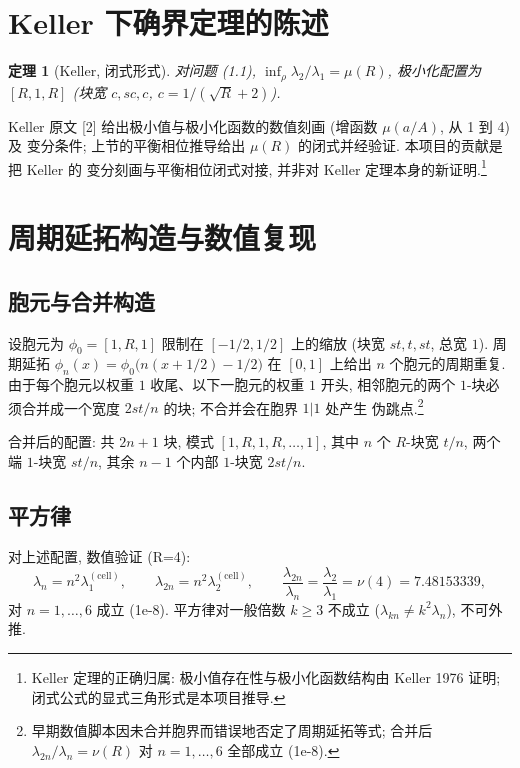 \documentclass[UTF8]{ctexart}
\newtheorem{theorem}{定理}[section]
\begin{document}
\section{Keller 下确界定理的陈述}

\begin{theorem}[Keller, 闭式形式]
对问题 (1.1), $\inf_{\rho} \lambda_2/\lambda_1 = \mu(R)$,
极小化配置为 $[R, 1, R]$ (块宽 $c, sc, c$, $c = 1/(\sqrt{R}+2)$).
\end{theorem}

Keller 原文 [2] 给出极小值与极小化函数的数值刻画 (增函数 $\mu(a/A)$, 从 1 到 4) 及
变分条件; 上节的平衡相位推导给出 $\mu(R)$ 的闭式并经验证. 本项目的贡献是把 Keller 的
变分刻画与平衡相位闭式对接, 并非对 Keller 定理本身的新证明.\footnote{Keller 定理的正确归属: 极小值存在性与极小化函数结构由 Keller 1976 证明; 闭式公式的显式三角形式是本项目推导.}

\section{周期延拓构造与数值复现}

\subsection{胞元与合并构造}

设胞元为 $\phi_0 = [1, R, 1]$ 限制在 $[-1/2, 1/2]$ 上的缩放 (块宽 $st, t, st$,
总宽 $1$). 周期延拓 $\phi_n(x) = \phi_0\bigl(n(x+1/2)-1/2\bigr)$ 在 $[0,1]$ 上给出
$n$ 个胞元的周期重复. 由于每个胞元以权重 $1$ 收尾、以下一胞元的权重 $1$ 开头,
相邻胞元的两个 $1$-块必须合并成一个宽度 $2st/n$ 的块; 不合并会在胞界 $1|1$ 处产生
伪跳点.\footnote{早期数值脚本因未合并胞界而错误地否定了周期延拓等式; 合并后
$\lambda_{2n}/\lambda_n = \nu(R)$ 对 $n = 1,\dots,6$ 全部成立 (1e-8).}

合并后的配置: 共 $2n+1$ 块, 模式 $[1, R, 1, R, \dots, 1]$,
其中 $n$ 个 $R$-块宽 $t/n$, 两个端 $1$-块宽 $st/n$, 其余 $n-1$ 个内部 $1$-块宽 $2st/n$.

\subsection{平方律}

对上述配置, 数值验证 (R=4):
\begin{equation}
	\lambda_n = n^2 \lambda_1^{(\text{cell})}, \qquad
	\lambda_{2n} = n^2 \lambda_2^{(\text{cell})}, \qquad
	\frac{\lambda_{2n}}{\lambda_n} = \frac{\lambda_2}{\lambda_1} = \nu(4) = 7.48153339,
\end{equation}
对 $n = 1, \dots, 6$ 成立 (1e-8). 平方律对一般倍数 $k \geq 3$ 不成立
($\lambda_{kn} \neq k^2 \lambda_n$), 不可外推.
\end{document}
